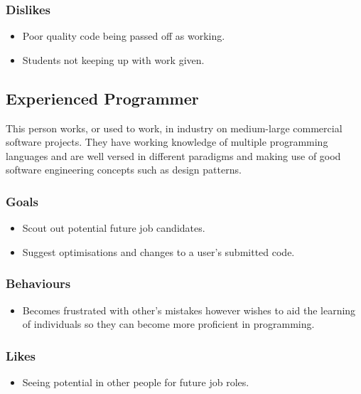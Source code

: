 \documentclass[11pt,a4paper]{article}
\begin{document}
\subsubsection{Dislikes}

\begin{itemize}
\item Poor quality code being passed off as working.
\item Students not keeping up with work given.
\end{itemize}

\newpage

\subsection{Experienced Programmer}

This person works, or used to work, in industry on medium-large commercial
software projects. They have working knowledge of multiple programming
languages and are well versed in different paradigms and making use of good
software engineering concepts such as design patterns.

\subsubsection{Goals}

\begin{itemize}
\item Scout out potential future job candidates.
\item Suggest optimisations and changes to a user's submitted code.
\end{itemize}

\subsubsection{Behaviours}

\begin{itemize}
\item Becomes frustrated with other's mistakes however wishes to aid the
learning of individuals so they can become more proficient in programming.
\end{itemize}

\subsubsection{Likes}

\begin{itemize}
\item Seeing potential in other people for future job roles.
\end{itemize}
\end{document}

